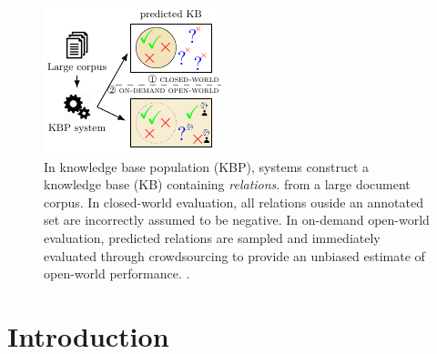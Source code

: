\begin{figure}[t]
  \includegraphics[width=\columnwidth]{figures/overview}
  \caption{\label{fig:overview}
  In knowledge base population (KBP), systems construct a knowledge base (KB) containing \textit{relations}. %
  from a large document corpus.
  In closed-world evaluation, %
  all relations ouside an annotated set are incorrectly assumed to be negative.
  In on-demand open-world evaluation,
  predicted relations are sampled and immediately evaluated through crowdsourcing
  to provide an unbiased estimate of open-world performance. %
  .
  }
\end{figure}

\section{Introduction}
\label{sec:intro}

